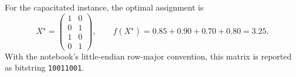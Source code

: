 For the capacitated instance, the optimal assignment is
\begin{equation}
X^\star=
\begin{pmatrix}
1&0\\
0&1\\
1&0\\
0&1
\end{pmatrix},
\qquad
f(X^\star)=0.85+0.90+0.70+0.80=3.25.
\label{eq:optimal_assignment_42}
\end{equation}
With the notebook's little-endian row-major convention, this matrix is reported as bitstring \texttt{10011001}.

